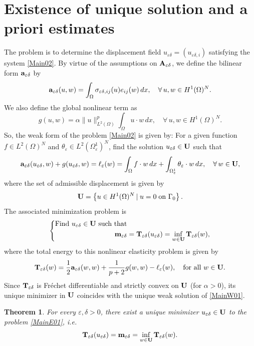 \documentclass[11pt,a4paper]{article}
\numberwithin{equation}{section}
\def\O{\Omega}
\def\d{\delta}
\def\e{\varepsilon}
\def\Ga{{\bf a}}
\def\ed{{\varepsilon\delta}}
\def\Ga{{\bf a}}
\def\Gm{{\bf m}}
\def\GA{{\bf A}}
\def\GT{{\bf T}}
\def\GU{{\bf U}}
\newtheorem{theorem}{Theorem}[section]
\begin{document}
\section{Existence of unique solution and a priori estimates}\label{S03}
The problem is to determine the displacement field $u_\ed=(u_{\ed,i})$ satisfying the system \eqref{Main02}. By virtue of the assumptions on $\GA_\ed$, we define the bilinear form $\Ga_\ed$ by
\begin{equation*}
\Ga_\ed(u,w)=\int_{\O}\sigma_{\ed,ij}(u)e_{ij}(w)\,dx,\quad \forall\,u,w\in H^1(\O)^N.
\end{equation*}
We also define the global nonlinear term as
$$g(u,w)=\alpha\|u\|^p_{L^2(\O)}\int_\O u\cdot w\,dx,\quad \forall\,u,w\in H^1(\O)^N.$$
So, the weak form of the problem \eqref{Main02} is given by: For a given function $f\in L^2(\O)^N$ and $\theta_\e\in L^2(\O_\e^1)^N$, find the solution ${u}_\ed\in \GU$ such that
\begin{equation}\label{MainW01}
\Ga_\ed(u_\ed,w)+g(u_\ed,w)=\ell_\e(w)=\int_\O f\cdot w\,dx+\int_{\O^1_\e}\theta_\e\cdot w\,dx,\quad \forall\,w\in \GU,
\end{equation}
where the set of admissible displacement is given by
$$\GU=\left\{u\in H^1(\O)^N\,|\; u=0\;\text{on $\Gamma_0$}\right\}.$$
The associated minimization problem is 
\begin{equation}\label{MainE01}
	\left\{\begin{aligned}
		&\text{Find $u_\ed\in\GU$ such that}\\
		&\hskip 3cm\Gm_\ed=\GT_\ed(u_\ed)=\inf_{w\in\GU}\GT_\ed(w),
	\end{aligned}\right.
\end{equation}
where the total energy to this nonlinear elasticity problem is given by
$$\GT_\ed(w)={1\over 2}\Ga_\ed(w,w)+{1\over p+2}g(w,w)-\ell_\e(w),\quad\text{for all $w\in\GU$}.$$
Since $\GT_{\e\d}$ is Fréchet differentiable and strictly convex on $\GU$ (for $\alpha>0$), its unique minimizer in $\GU$ coincides with the unique weak solution of \eqref{MainW01}.
\begin{theorem}\label{Th1}
	For every $\e,\d>0$, there exist a unique minimizer $u_\ed\in \GU$ to the problem \eqref{MainE01}, i.e.
	$$\GT_\ed(u_\ed)=\Gm_\ed=\inf_{w\in\GU}\GT_\ed(w).$$
\end{theorem}
\end{document}
